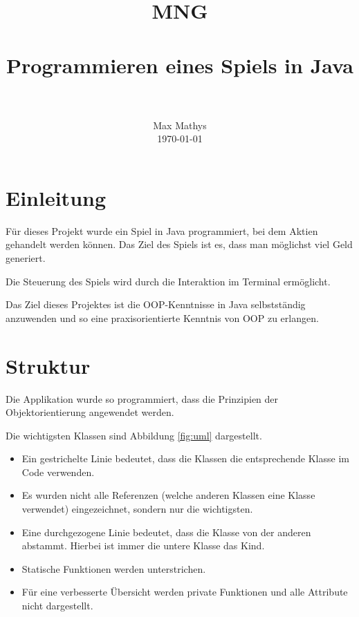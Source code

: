 \documentclass[paper=a4, fontsize=11pt]{scrartcl}
\title{
	\usefont{OT1}{bch}{b}{n}
	\normalfont \normalsize \textsc{MNG} \\ [25pt]
	\horrule{0.5pt} \\[0.4cm]
	\huge Programmieren eines Spiels in Java \\
	\horrule{2pt} \\[0.5cm]
}
\author{
	\normalfont 								\normalsize
	Max Mathys\\[-3pt]		\normalsize
	\today
}
\date{}
\numberwithin{equation}{section}		%
\numberwithin{figure}{section}			%
\numberwithin{table}{section}				%
\begin{document}
	\maketitle
	\section{Einleitung}
	
	Für dieses Projekt wurde ein Spiel in Java programmiert, bei dem Aktien gehandelt werden können. Das Ziel des Spiels ist es, dass man möglichst viel Geld generiert.
	
	Die Steuerung des Spiels wird durch die Interaktion im Terminal ermöglicht.
	
	Das Ziel dieses Projektes ist die OOP-Kenntnisse in Java selbstständig anzuwenden und so eine praxisorientierte Kenntnis von OOP zu erlangen.
	
	\section{Struktur}
	
	Die Applikation wurde so programmiert, dass die Prinzipien der Objektorientierung angewendet werden.
	
	Die wichtigsten Klassen sind Abbildung \ref{fig:uml} dargestellt.
	
	\begin{itemize}
		\item Ein gestrichelte Linie bedeutet, dass die Klassen die entsprechende Klasse im Code verwenden.
		\item Es wurden nicht alle Referenzen (welche anderen Klassen eine Klasse verwendet)  eingezeichnet, sondern nur die wichtigsten.
		\item Eine durchgezogene Linie bedeutet, dass die Klasse von der anderen abstammt. Hierbei ist immer die untere Klasse das Kind.
		\item Statische Funktionen werden unterstrichen.
		\item Für eine verbesserte Übersicht werden private Funktionen und alle Attribute nicht dargestellt.
		
	\end{itemize}
	
\end{document}

